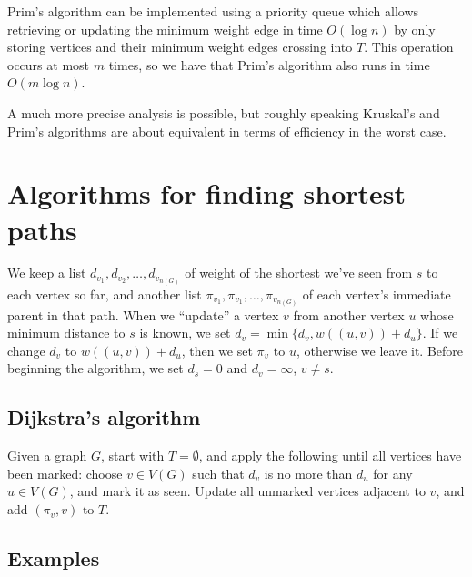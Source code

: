 \documentclass[11pt]{article}
\begin{document}
Prim's algorithm can be implemented using a priority queue which allows retrieving or updating the minimum weight edge in time $O(\log n)$ by only storing vertices and their minimum weight edges crossing into $T$.
This operation occurs at most $m$ times, so we have that Prim's algorithm also runs in time $O(m\log n)$. \cite{CLRS}

A much more precise analysis is possible, but roughly speaking Kruskal's and Prim's algorithms are about equivalent in terms of efficiency in the worst case.


\section{Algorithms for finding shortest paths}

We keep a list $d_{v_1},d_{v_2},\ldots,d_{v_{n(G)}}$ of weight of the shortest we've seen from $s$ to each vertex so far, and another list $\pi_{v_1},\pi_{v_1},\ldots,\pi_{v_{n(G)}}$ of each vertex's immediate parent in that path.
When we ``update'' a vertex $v$ from another vertex $u$ whose minimum distance to $s$ is known, we set $d_v=\min\{d_v,w((u,v))+d_u\}$.
If we change $d_v$ to $w((u,v))+d_u$, then we set $\pi_v$ to $u$, otherwise we leave it.
Before beginning the algorithm, we set $d_s=0$ and $d_v=\infty$, $v\neq s$.


\subsection{Dijkstra's algorithm}

Given a graph $G$, start with $T=\emptyset$, and apply the following until all vertices have been marked: choose $v\in V(G)$ such that $d_v$ is no more than $d_u$ for any $u\in V(G)$, and mark it as seen.
Update all unmarked vertices adjacent to $v$, and add $(\pi_v,v)$ to $T$. \cite{MST}


\subsection{Examples}

\begin{figure}[H]

\end{figure}
\begin{figure}[H]

\end{figure}
\begin{figure}[H]

\end{figure}
\end{document}
